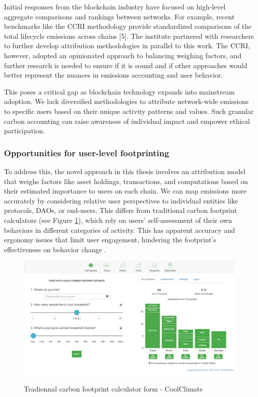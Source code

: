 \documentclass[11pt]{report}
\begin{document}
Initial responses from the blockchain industry have focused on high-level aggregate comparisons and rankings between networks. For example, recent benchmarks like the \ac{CCRI} methodology provide standardized comparisons of the total lifecycle emissions across chains [5]. The institute partnered with researchers to further develop attribution methodologies in parallel to this work. The CCRI, however, adopted an opinionated approach to balancing weighing factors, and further research is needed to ensure if it is sound and if other approaches would better represent the nuances in emissions accounting and user behavior.

This poses a critical gap as blockchain technology expands into mainstream adoption. We lack diversified methodologies to attribute network-wide emissions to specific users based on their unique activity patterns and values. Such granular carbon accounting can raise awareness of individual impact and empower ethical participation.

\subsubsection*{Opportunities for user-level footprinting}

To address this, the novel approach in this thesis involves an attribution model that weighs factors like asset holdings, transactions, and computations based on their estimated importance to users on each chain. We can map emissions more accurately by considering relative user perspectives to individual entities like protocols, DAOs, or end-users. This differs from traditional carbon footprint calculators (see Figure \ref{fig:carbon_footprint_calculator}), which rely on users' self-assessment of their own behaviors in different categories of activity. This has apparent accuracy and ergonomy issues that limit user engagement, hindering the footprint's effectiveness on behavior change \cite{saloOpportunitiesLimitationsCarbon2019,mulrowStateCarbonFootprint2019}.


\begin{figure}[hbt!]
    \centering
    \centerline{\includegraphics[scale=0.25]{figures/carbon_footprint_calculator.png}}
    \caption[YO]{Tradionnal carbon footprint calculator form - CoolClimate\footnotemark}
    \label{fig:carbon_footprint_calculator}
\end{figure}
\end{document}
